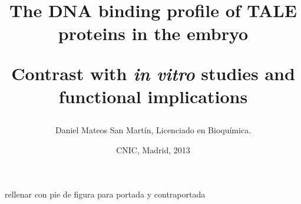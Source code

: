 \setlength{\droptitle}{-100pt}
\title{The {DNA} binding profile of {TALE} proteins in the embryo \par \vspace{20pt} \LARGE Contrast with \textit{in vitro} studies and functional implications}
\preauthor{\vfill \begin{center}
	\Large \lineskip 0.5em}
\author{Daniel Mateos San Martín, Licenciado en Bioquímica.}
\date{CNIC, Madrid, 2013}
\savepagenumber

\maketitle
\thispagestyle{cleared}

\newpage
\null
\vfill
\thispagestyle{cleared}
rellenar con pie de figura para portada y contraportada

